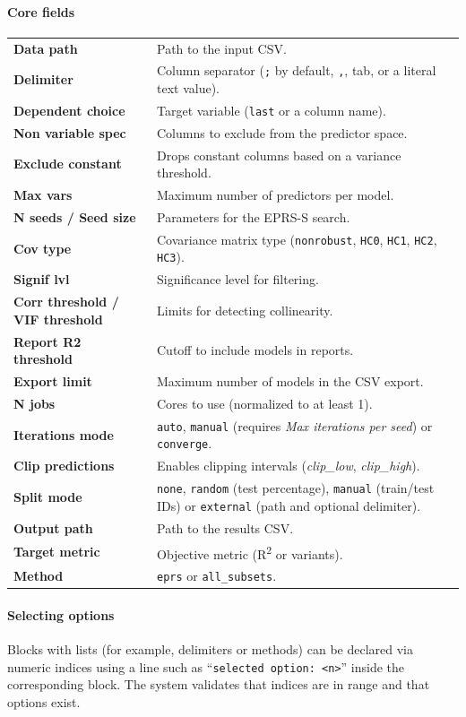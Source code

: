\documentclass[11pt,a4paper]{article}
\begin{document}
\paragraph{Core fields}
\begin{longtable}{>{\bfseries}p{4cm}p{10cm}}
Data path & Path to the input CSV.\\
Delimiter & Column separator (\verb|;| by default, \verb|,|, tab, or a literal text value).\\
Dependent choice & Target variable (\verb|last| or a column name).\\
Non variable spec & Columns to exclude from the predictor space.\\
Exclude constant & Drops constant columns based on a variance threshold.\\
Max vars & Maximum number of predictors per model.\\
N seeds / Seed size & Parameters for the EPRS-S search.\\
Cov type & Covariance matrix type (\texttt{nonrobust}, \texttt{HC0}, \texttt{HC1}, \texttt{HC2}, \texttt{HC3}).\\
Signif lvl & Significance level for filtering.\\
Corr threshold / VIF threshold & Limits for detecting collinearity.\\
Report R2 threshold & Cutoff to include models in reports.\\
Export limit & Maximum number of models in the CSV export.\\
N jobs & Cores to use (normalized to at least 1).\\
Iterations mode & \texttt{auto}, \texttt{manual} (requires \textit{Max iterations per seed}) or \texttt{converge}.\\
Clip predictions & Enables clipping intervals (\textit{clip\_low}, \textit{clip\_high}).\\
Split mode & \texttt{none}, \texttt{random} (test percentage), \texttt{manual} (train/test IDs) or \texttt{external} (path and optional delimiter).\\
Output path & Path to the results CSV.\\
Target metric & Objective metric (R\textsuperscript{2} or variants).\\
Method & \texttt{eprs} or \texttt{all\_subsets}.\\
\end{longtable}

\paragraph{Selecting options}
Blocks with lists (for example, delimiters or methods) can be declared via numeric indices using a line such as ``\texttt{selected option: <n>}'' inside the corresponding block. The system validates that indices are in range and that options exist.\cite{mlrx-source-config}
\end{document}
